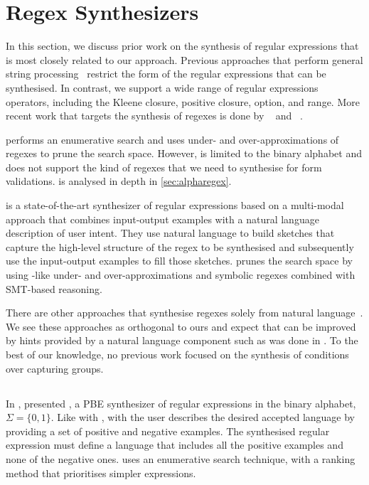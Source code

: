 \section{Regex Synthesizers}\label{sec:rel-regex-synthesizers}

In this section, we discuss prior work on the synthesis of regular expressions that is most closely related to our approach.
%
Previous approaches that perform general string processing~\cite{DBLP:conf/popl/Gulwani11,Fidex16} restrict the form of the regular expressions that can be synthesised. In contrast, we support a wide range of regular expressions operators, including the Kleene closure, positive closure, option, and range. 
%
More recent work that targets the synthesis of regexes is done by \AlphaRegex~\cite{AlphaRegex16} and \Regel~\cite{Regel20}.

\AlphaRegex performs an enumerative search and uses under- and over-approximations of regexes to prune the search space. However, \AlphaRegex is limited to the binary alphabet and does not support the kind of regexes that we need to synthesise for form validations. \AlphaRegex is analysed in depth in \autoref{sec:alpharegex}.


\Regel is a state-of-the-art synthesizer of regular expressions based on a multi-modal approach that combines input-output examples with a natural language description of user intent. They use natural language to build sketches that capture the high-level structure of the regex to be synthesised and subsequently use the input-output examples to fill those sketches. 
\Regel prunes the search space by using \AlphaRegex-like under- and over-approximations and symbolic regexes combined with SMT-based reasoning.

There are other approaches that synthesise regexes solely from natural language~\cite{DBLP:conf/naacl/KushmanB13,DBLP:conf/emnlp/LocascioNDKB16,DBLP:conf/emnlp/ZhongGYPXLLZ18}. We see these approaches as orthogonal to ours and expect that \Forest can be improved by hints provided by a natural language component such as was done in \Regel.
%
To the best of our knowledge, no previous work focused on the synthesis of conditions over capturing groups.


\subsection{\AlphaRegex}
\label{sec:alpharegex}
In \citeyear{AlphaRegex16}, \citet{AlphaRegex16} presented \AlphaRegex, a \ac{PBE} synthesizer of regular expressions in the binary alphabet, \(\Sigma = \{0, 1\}\).
%
Like with \Forest, with \AlphaRegex the user describes the desired accepted language by providing a set of positive and negative examples. The synthesised regular expression must define a language that includes all the positive examples and none of the negative ones.
\AlphaRegex uses an enumerative search technique, with a ranking method that prioritises simpler expressions.

